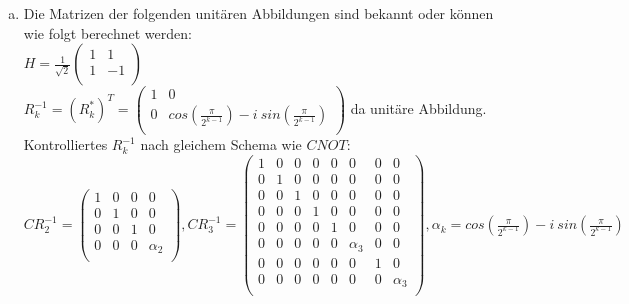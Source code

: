 \documentclass[a4paper]{scrartcl}
\begin{document}
\begin{enumerate}[a)]
\item Die Matrizen der folgenden unitären Abbildungen sind bekannt oder können wie folgt berechnet werden:\\
$H=\frac{1}{\sqrt{2}}\begin{pmatrix} 1 & 1\\ 1 & -1\\\end{pmatrix}$\\
$R_k^{-1}=(R_k^{*})^T=\begin{pmatrix} 1 & 0\\ 0 & cos(\frac{\pi}{2^{k-1}})-i~sin(\frac{\pi}{2^{k-1}})\\\end{pmatrix}$ da unitäre Abbildung.\\
Kontrolliertes $R_k^{-1}$ nach gleichem Schema wie $CNOT$:\\
$CR_2^{-1}=
\begin{pmatrix} 1 & 0 & 0 & 0\\
0 & 1 & 0 & 0\\
0 & 0 & 1 & 0\\
0 & 0 & 0 & \alpha_2\\\end{pmatrix}, CR_3^{-1}=
\begin{pmatrix}
1 & 0 & 0 & 0 & 0 & 0 & 0 & 0\\
0 & 1 & 0 & 0 & 0 & 0 & 0 & 0\\
0 & 0 & 1 & 0 & 0 & 0 & 0 & 0\\
0 & 0 & 0 & 1 & 0 & 0 & 0 & 0\\
0 & 0 & 0 & 0 & 1 & 0 & 0 & 0\\
0 & 0 & 0 & 0 & 0 & \alpha_3 & 0 & 0\\
0 & 0 & 0 & 0 & 0 & 0 & 1 & 0\\
0 & 0 & 0 & 0 & 0 & 0 & 0 & \alpha_3\\\end{pmatrix}, \alpha_k = cos(\frac{\pi}{2^{k-1}})-i~sin(\frac{\pi}{2^{k-1}})$\\


\end{enumerate}
\end{document}
